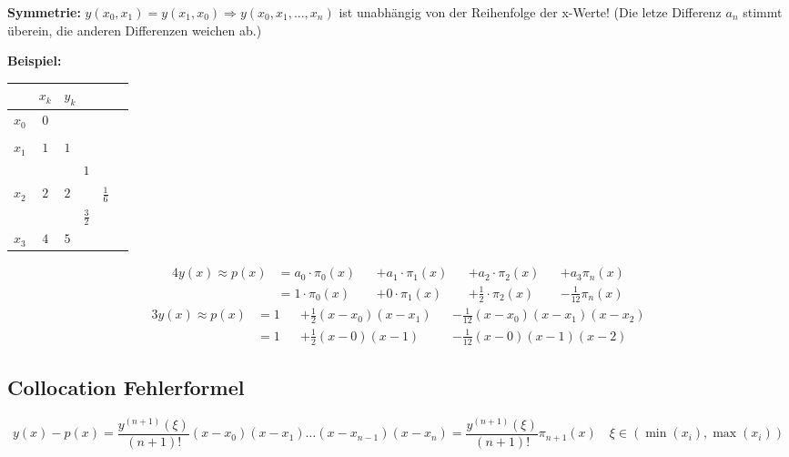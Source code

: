 \textbf{Symmetrie:} $y(x_0,x_1) = y(x_1,x_0) \Longrightarrow y(x_0,x_1,...,x_n)$ ist unabhängig von der Reihenfolge der x-Werte! (Die letze Differenz $a_n$ stimmt überein, die anderen Differenzen weichen ab.)

\newpage

\textbf{Beispiel:}\\
\begin{minipage}[c]{6.0cm}
	\begin{tabular}{|c||c|llll|}
	\hline
			&$x_k$	&\multicolumn{4}{l|}{$y_k$}\\
	\hline
	$x_0$	&$0$	&\kreisS{$1$}{$a_0$}&			&			&\\
		 	&		&			&\kreisS{$0$}{$a_1$}&			&\\
	$x_1$	&$1$	&$1$		&			&\kreisM{$\frac 12$}{$a_2$}&\\
			&		&			&$1$		&			&\kreisB{$-\frac{1}{12}$}{$a_3$}\\
	$x_2$	&$2$	&$2$		&			&$\frac 16$&\\
			&		&			&$\frac{3}{2}$		&			&\\
	$x_3$	&$4$	&$5$		&			&			&\\
	\hline
	\end{tabular}
\end{minipage}
\hfill
\begin{minipage}[c]{13cm}
	\begin{alignat}{4}
		y(x)\approx p(x)&=a_0\cdot \pi_0(x) &&+a_1\cdot\pi_1(x)  &&+a_2\cdot\pi_2(x)&&+ a_3\pi_n(x)\nonumber\\[0.3cm]
		&=1\cdot \pi_0(x) &&+0\cdot\pi_1(x)  &&+\frac 12\cdot\pi_2(x)&&- \frac 1{12}\pi_n(x)\nonumber %
	\end{alignat}
	\begin{alignat}{3}
	y(x)\approx p(x)&=1&&+\frac 12(x-x_0)(x-x_1)&&-\frac 1{12} (x-x_0)(x-x_1)(x-x_2)\nonumber\\[0.3cm]
	&=1&&+\frac 12(x-0)(x-1)&&-\frac 1{12} (x-0)(x-1)(x-2)\nonumber
	\end{alignat}
\end{minipage}


\subsection{Collocation Fehlerformel}
$$y(x)-p(x) = \frac{y^{(n+1)}(\xi)}{(n+1)!} (x-x_0)(x-x_1)\ldots(x-x_{n-1})(x-x_n) = \frac{y^{(n+1)}(\xi)}{(n+1)!}\pi_{n+1}(x) \quad \xi \in (\min(x_i), \max(x_i))$$

